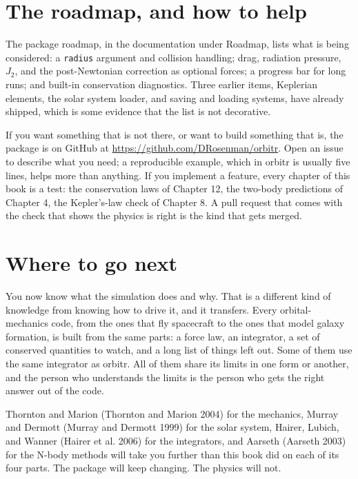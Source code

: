 \documentclass[
  10.5pt,
  letterpaper,
]{scrbook}
\theoremstyle{plain}
\theoremstyle{remark}
\begin{document}
\section{The roadmap, and how to
help}\label{the-roadmap-and-how-to-help}

The package roadmap, in the documentation under Roadmap, lists what is
being considered: a \texttt{radius} argument and collision handling;
drag, radiation pressure, \(J_2\), and the post-Newtonian correction as
optional forces; a progress bar for long runs; and built-in conservation
diagnostics. Three earlier items, Keplerian elements, the solar system
loader, and saving and loading systems, have already shipped, which is
some evidence that the list is not decorative.

If you want something that is not there, or want to build something that
is, the package is on GitHub at
\url{https://github.com/DRosenman/orbitr}. Open an issue to describe
what you need; a reproducible example, which in orbitr is usually five
lines, helps more than anything. If you implement a feature, every
chapter of this book is a test: the conservation laws of Chapter 12, the
two-body predictions of Chapter 4, the Kepler's-law check of Chapter 8.
A pull request that comes with the check that shows the physics is right
is the kind that gets merged.

\section{Where to go next}\label{where-to-go-next}

You now know what the simulation does and why. That is a different kind
of knowledge from knowing how to drive it, and it transfers. Every
orbital-mechanics code, from the ones that fly spacecraft to the ones
that model galaxy formation, is built from the same parts: a force law,
an integrator, a set of conserved quantities to watch, and a long list
of things left out. Some of them use the same integrator as orbitr. All
of them share its limits in one form or another, and the person who
understands the limits is the person who gets the right answer out of
the code.

Thornton and Marion (Thornton and Marion 2004) for the mechanics, Murray
and Dermott (Murray and Dermott 1999) for the solar system, Hairer,
Lubich, and Wanner (Hairer et al. 2006) for the integrators, and Aarseth
(Aarseth 2003) for the N-body methods will take you further than this
book did on each of its four parts. The package will keep changing. The
physics will not.
\end{document}
